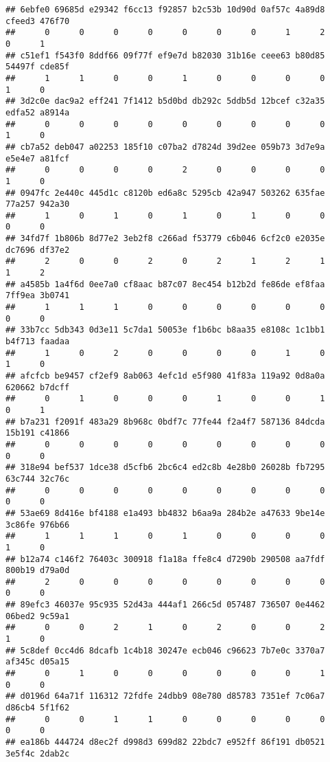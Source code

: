 \documentclass[
]{article}
\begin{document}
\begin{verbatim}
## 6ebfe0 69685d e29342 f6cc13 f92857 b2c53b 10d90d 0af57c 4a89d8 cfeed3 476f70 
##      0      0      0      0      0      0      0      1      2      0      1 
## c51ef1 f543f0 8ddf66 09f77f ef9e7d b82030 31b16e ceee63 b80d85 54497f cde85f 
##      1      1      0      0      1      0      0      0      0      1      0 
## 3d2c0e dac9a2 eff241 7f1412 b5d0bd db292c 5ddb5d 12bcef c32a35 edfa52 a8914a 
##      0      0      0      0      0      0      0      0      0      1      0 
## cb7a52 deb047 a02253 185f10 c07ba2 d7824d 39d2ee 059b73 3d7e9a e5e4e7 a81fcf 
##      0      0      0      0      2      0      0      0      0      1      0 
## 0947fc 2e440c 445d1c c8120b ed6a8c 5295cb 42a947 503262 635fae 77a257 942a30 
##      1      0      1      0      1      0      1      0      0      0      0 
## 34fd7f 1b806b 8d77e2 3eb2f8 c266ad f53779 c6b046 6cf2c0 e2035e dc7696 df37e2 
##      2      0      0      2      0      2      1      2      1      1      2 
## a4585b 1a4f6d 0ee7a0 cf8aac b87c07 8ec454 b12b2d fe86de ef8faa 7ff9ea 3b0741 
##      1      1      1      0      0      0      0      0      0      0      0 
## 33b7cc 5db343 0d3e11 5c7da1 50053e f1b6bc b8aa35 e8108c 1c1bb1 b4f713 faadaa 
##      1      0      2      0      0      0      0      1      0      1      0 
## afcfcb be9457 cf2ef9 8ab063 4efc1d e5f980 41f83a 119a92 0d8a0a 620662 b7dcff 
##      0      1      0      0      0      1      0      0      1      0      1 
## b7a231 f2091f 483a29 8b968c 0bdf7c 77fe44 f2a4f7 587136 84dcda 15b191 c41866 
##      0      0      0      0      0      0      0      0      0      0      0 
## 318e94 bef537 1dce38 d5cfb6 2bc6c4 ed2c8b 4e28b0 26028b fb7295 63c744 32c76c 
##      0      0      0      0      0      0      0      0      0      0      0 
## 53ae69 8d416e bf4188 e1a493 bb4832 b6aa9a 284b2e a47633 9be14e 3c86fe 976b66 
##      1      1      1      0      1      0      0      0      0      1      0 
## b12a74 c146f2 76403c 300918 f1a18a ffe8c4 d7290b 290508 aa7fdf 800b19 d79a0d 
##      2      0      0      0      0      0      0      0      0      0      0 
## 89efc3 46037e 95c935 52d43a 444af1 266c5d 057487 736507 0e4462 06bed2 9c59a1 
##      0      0      2      1      0      2      0      0      2      1      0 
## 5c8def 0cc4d6 8dcafb 1c4b18 30247e ecb046 c96623 7b7e0c 3370a7 af345c d05a15 
##      0      1      0      0      0      0      0      0      1      0      0 
## d0196d 64a71f 116312 72fdfe 24dbb9 08e780 d85783 7351ef 7c06a7 d86cb4 5f1f62 
##      0      0      1      1      0      0      0      0      0      0      0 
## ea186b 444724 d8ec2f d998d3 699d82 22bdc7 e952ff 86f191 db0521 3e5f4c 2dab2c 

\end{verbatim}
\end{document}
